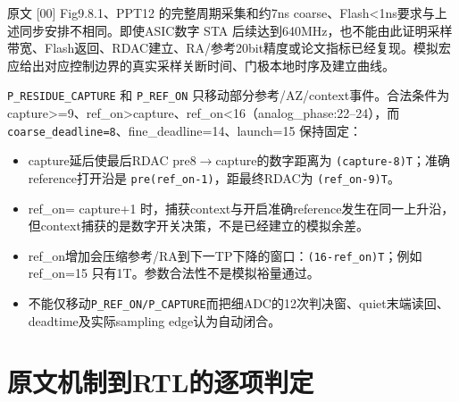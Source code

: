 \documentclass[UTF8,fontset=fandol,10pt,a4paper,openany]{ctexrep}
\newcommand{\code}[1]{\nolinkurl{#1}}
\begin{document}
原文 [00] Fig9.8.1、PPT12 的完整周期采集和约7ns coarse、Flash<1ns要求与上述同步安排不相同。即使ASIC数字 STA 后续达到640MHz，也不能由此证明采样带宽、Flash返回、RDAC建立、RA/参考20bit精度或论文指标已经复现。模拟宏应给出对应控制边界的真实采样关断时间、门极本地时序及建立曲线。


\code{P_RESIDUE_CAPTURE} 和 \code{P_REF_ON} 只移动部分参考/AZ/context事件。合法条件为 capture>=9、ref\_on>capture、ref\_on<16（analog\_phase:22–24），而 \code{coarse_deadline=8}、fine\_deadline=14、launch=15 保持固定：


\begin{itemize}
\item capture延后使最后RDAC pre8\ensuremath{\rightarrow}capture的数字距离为 \code{(capture-8)T}；准确reference打开沿是 \code{pre(ref_on-1)}，距最终RDAC为 \code{(ref_on-9)T}。
\item ref\_on= capture+1 时，捕获context与开启准确reference发生在同一上升沿，但context捕获的是数字开关决策，不是已经建立的模拟余差。
\item ref\_on增加会压缩参考/RA到下一TP下降的窗口：\code{(16-ref_on)T}；例如 ref\_on=15 只有1T。参数合法性不是模拟裕量通过。
\item 不能仅移动\code{P_REF_ON/P_CAPTURE}而把细ADC的12次判决窗、quiet末端读回、deadtime及实际sampling edge认为自动闭合。
\end{itemize}


\section{原文机制到RTL的逐项判定}
\end{document}
